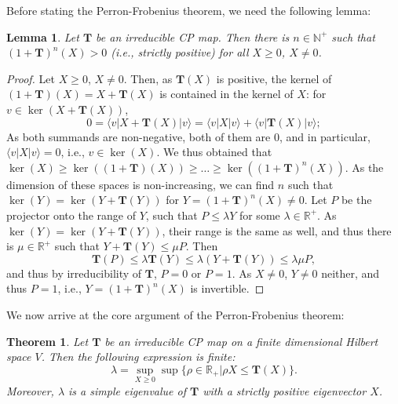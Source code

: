 \documentclass{article}
\newtheorem{lemma}{Lemma}
\newtheorem{theorem}{Theorem}
\newcommand{\ket}[1]{\vert #1 \rangle}
\newcommand{\bra}[1]{\langle #1 \vert}
\begin{document}
Before stating the Perron-Frobenius theorem, we need the following lemma:
\begin{lemma}\label{lem:irreducible_invertibility}
  Let $\mathbf{T}$ be an irreducible CP map. Then there is $n\in \mathbb{N}^+$ such that $(1+\mathbf{T})^n(X) > 0$ (i.e., strictly positive) for all $X\geq 0$, $X\neq 0$.
\end{lemma}

\begin{proof}
  Let $X\geq 0$, $X\neq 0$. Then, as $\mathbf{T}(X)$ is positive, the kernel of $(1+\mathbf{T})(X) = X+\mathbf{T}(X)$ is contained in the kernel of $X$: for $v\in \ker(X + \mathbf{T}(X))$,
  \begin{equation*}
    0 = \bra{v} X + \mathbf{T}(X) \ket{v} = \bra{v} X \ket{v} +  \bra{v} \mathbf{T}(X) \ket{v};
  \end{equation*}
  As both summands are non-negative, both of them are $0$, and in particular, $\bra{v} X \ket{v} = 0$, i.e., $v\in\ker(X)$. We thus obtained that $\ker(X)\geq \ker((1+\mathbf{T})(X)) \geq \dots \geq \ker((1+\mathbf{T})^n (X))$. As the dimension of these spaces is non-increasing, we can find $n$ such that $\ker (Y) = \ker(Y + \mathbf{T}(Y))$ for  $Y = (1+\mathbf{T})^n(X)\neq 0$. 
  Let $P$ be the projector onto the range of $Y$, such that $ P \leq \lambda Y$ for some $\lambda\in\mathbb{R}^+$. As $\ker (Y) = \ker(Y + \mathbf{T}(Y))$, their range is the same as well, and thus there is $\mu\in\mathbb{R}^+$ such that $Y + \mathbf{T}(Y) \leq \mu P$. Then
  \begin{equation*}
    \mathbf{T}(P) \leq \lambda \mathbf{T}(Y) \leq \lambda(Y+\mathbf{T}(Y)) \leq \lambda\mu P,
  \end{equation*}
  and thus by irreducibility of $\mathbf{T}$, $P=0$ or $P=1$. As $X\neq 0$, $Y\neq 0$ neither, and thus  $P = 1$, i.e., $Y = (1+\mathbf{T})^n(X)$ is invertible.
\end{proof}

We now arrive at the core argument of the Perron-Frobenius theorem:
\begin{theorem}
  Let $\mathbf{T}$ be an irreducible CP map on a finite dimensional Hilbert space $V$. Then the following expression is finite: 
  \begin{equation*}
  \lambda = \sup_{X\geq 0} \sup \{\rho\in \mathbb{R}_+| \rho X \leq \mathbf{T}(X) \}.
  \end{equation*} 
  Moreover, $\lambda$ is a simple eigenvalue of $\mathbf{T}$ with a strictly positive eigenvector $X$.
\end{theorem}
\end{document}
